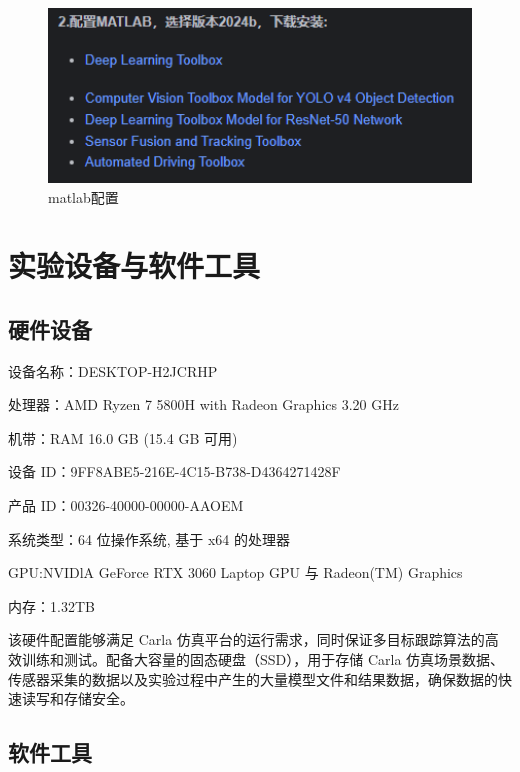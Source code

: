 \begin{figure}[htbp] %
	\centering
	\includegraphics[width=1\textwidth]{p8} %
	\caption{matlab配置} %
	\label{fig:p8} %
\end{figure}






\section{实验设备与软件工具}

\subsection{硬件设备}

设备名称：DESKTOP-H2JCRHP

处理器：AMD Ryzen 7 5800H with Radeon Graphics            3.20 GHz

机带：RAM	16.0 GB (15.4 GB 可用)

设备 ID：9FF8ABE5-216E-4C15-B738-D4364271428F

产品 ID：00326-40000-00000-AAOEM

系统类型：64 位操作系统, 基于 x64 的处理器

GPU:NVIDlA GeForce RTX 3060 Laptop GPU 与 Radeon(TM) Graphics

内存：1.32TB

该硬件配置能够满足 Carla 仿真平台的运行需求，同时保证多目标跟踪算法的高效训练和测试。配备大容量的固态硬盘（SSD），用于存储 Carla 仿真场景数据、传感器采集的数据以及实验过程中产生的大量模型文件和结果数据，确保数据的快速读写和存储安全。



\subsection{软件工具}

